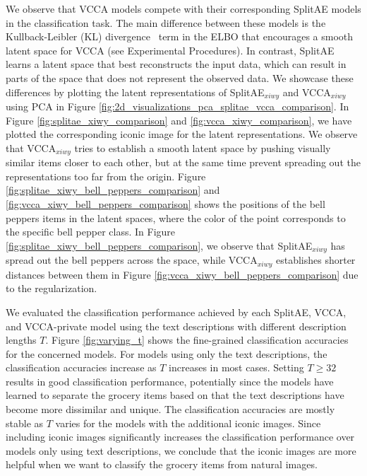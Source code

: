 We observe that VCCA models compete with their corresponding SplitAE models in the classification task. The main difference between these models is the Kullback-Leibler (KL) divergence~\cite{kullback1951information} term in the ELBO that encourages a smooth latent space for VCCA (see Experimental Procedures). In contrast, SplitAE learns a latent space that best reconstructs the input data, which can result in parts of the space that does not represent the observed data. We showcase these differences by plotting the latent representations of SplitAE$_{x i w y}$ and VCCA$_{x i w y}$ using PCA in Figure \ref{fig:2d_visualizations_pca_splitae_vcca_comparison}. In Figure \ref{fig:splitae_xiwy_comparison} and \ref{fig:vcca_xiwy_comparison}, we have plotted the corresponding iconic image for the latent representations. We observe that VCCA$_{x i w y}$ tries to establish a smooth latent space by pushing visually similar items closer to each other, but at the same time prevent spreading out the representations too far from the origin. Figure \ref{fig:splitae_xiwy_bell_peppers_comparison} and \ref{fig:vcca_xiwy_bell_peppers_comparison} shows the positions of the bell peppers items in the latent spaces, where the color of the point corresponds to the specific bell pepper class. In Figure \ref{fig:splitae_xiwy_bell_peppers_comparison}, we observe that SplitAE$_{x i w y}$ has spread out the bell peppers across the space, while VCCA$_{x i w y}$ establishes shorter distances between them in Figure \ref{fig:vcca_xiwy_bell_peppers_comparison} due to the regularization.



%


We evaluated the classification performance achieved by each SplitAE, VCCA, and VCCA-private model using the text descriptions with different description lengths $T$. Figure \ref{fig:varying_t} shows the fine-grained classification accuracies for the concerned models. For models using only the text descriptions, the classification accuracies increase as $T$ increases in most cases. Setting $T \geq 32$ results in good classification performance, potentially since the models have learned to separate the grocery items based on that the text descriptions have become more dissimilar and unique. The classification accuracies are mostly stable as $T$ varies for the models with the additional iconic images. Since including iconic images significantly increases the classification performance over models only using text descriptions, we conclude that the iconic images are more helpful when we want to classify the grocery items from natural images. 


